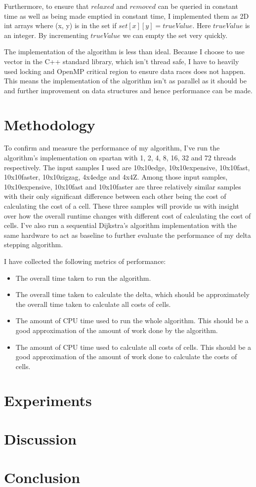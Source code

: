 \documentclass{article}
\begin{document}
Furthermore, to ensure that $relaxed$ and $removed$ can be queried in constant time as well as being
made emptied in constant time, I implemented them as 2D int arrays where (x, y) is in the set if
$set[x][y] = trueValue$. Here $trueValue$ is an integer. By incrementing $trueValue$ we can empty
the set very quickly.

The implementation of the algorithm is less than ideal. Because I choose to use vector in the C++
standard library, which isn't thread safe, I have to heavily used locking and OpenMP critical
region to ensure data races does not happen. This means the implementation of the algorithm isn't as
parallel as it should be and further improvement on data structures and hence performance can be
made.

\section*{Methodology}
To confirm and measure the performance of my algorithm, I've run the algorithm's implementation on
spartan with 1, 2, 4, 8, 16, 32 and 72 threads respectively. The input samples I used are 10x10edge,
10x10expensive, 10x10fast, 10x10faster, 10x10zigzag, 4x4edge and 4x4Z. Among those input samples,
10x10expensive, 10x10fast and 10x10faster are three relatively similar samples with their only
significant difference between each other being the cost of calculating the cost of a cell. These
three samples will provide us with insight over how the overall runtime changes with different cost
of calculating the cost of cells. I've also run a sequential Dijkstra's algorithm implementation
with the same hardware to act as baseline to further evaluate the performance of my delta stepping
algorithm.

I have collected the following metrics of performance:
\begin{itemize}
	\item The overall time taken to run the algorithm.
	\item The overall time taken to calculate the delta, which should be approximately the overall
		time taken to calculate all costs of cells.
	\item The amount of CPU time used to run the whole algorithm. This should be a good
		approximation of the amount of work done by the algorithm.
	\item The amount of CPU time used to calculate all costs of cells. This should be a good
		approximation of the amount of work done to calculate the costs of cells.
\end{itemize}

\section*{Experiments}
\section*{Discussion}
\section*{Conclusion}

\printbibliography
\end{document}
